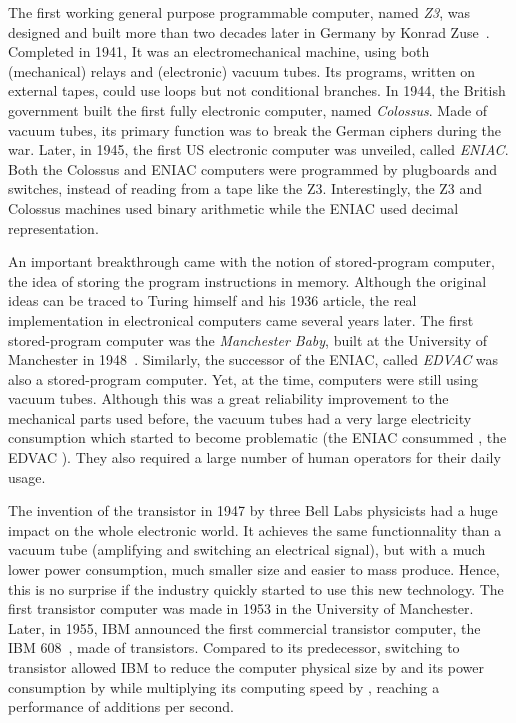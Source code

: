         The first working general purpose programmable computer, named \emph{Z3}, was designed and built more than two
        decades later in Germany by Konrad Zuse~\cite{sep-computing-history}. Completed in 1941, It was an
        electromechanical machine, using both (mechanical) relays and (electronic) vacuum tubes. Its programs, written
        on external tapes, could use loops but not conditional branches. In 1944, the British government built the first
        fully electronic computer, named \emph{Colossus}. Made of vacuum tubes, its primary function was to break the
        German ciphers during the war. Later, in 1945, the first US electronic computer was unveiled, called
        \emph{ENIAC}. Both the Colossus and ENIAC computers were programmed by plugboards and switches, instead of
        reading from a tape like the Z3. Interestingly, the Z3 and Colossus machines used binary arithmetic while the
        ENIAC used decimal representation.

        An important breakthrough came with the notion of stored-program computer, \ie the idea of storing the program
        instructions in memory. Although the original ideas can be traced to Turing himself and his 1936 article, the
        real implementation in electronical computers came several years later. The first stored-program computer was
        the \emph{Manchester Baby}, built at the University of Manchester in 1948~\cite{sep-computing-history}.
        Similarly, the successor of the ENIAC, called \emph{EDVAC} was also a stored-program computer. Yet, at the time,
        computers were still using vacuum tubes. Although this was a great reliability improvement to the mechanical
        parts used before, the vacuum tubes had a very large electricity consumption which started to become problematic
        (the ENIAC consummed , the EDVAC ). They also required a large number of
        human operators for their daily usage.

        The invention of the transistor in 1947 by three Bell Labs physicists had a huge impact on the whole electronic
        world. It achieves the same functionnality than a vacuum tube (amplifying and switching an electrical signal),
        but with a much lower power consumption, much smaller size and easier to mass produce. Hence, this is no
        surprise if the industry quickly started to use this new technology. The first transistor computer was made in
        1953 in the University of Manchester. Later, in 1955, IBM announced the first commercial transistor computer,
        the IBM 608~\cite{ibm608}, made of  transistors. Compared to its predecessor, switching to transistor
        allowed IBM to reduce the computer physical size by  and its power consumption by
         while multiplying its computing speed by , reaching a performance of 
        additions per second.

